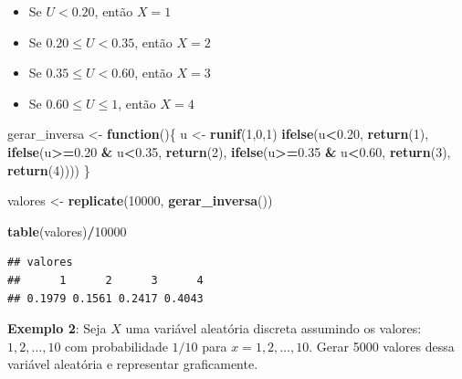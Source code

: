 \documentclass[
]{book}
\newenvironment{Shaded}{\begin{snugshade}}{\end{snugshade}}
\newcommand{\ControlFlowTok}[1]{\textcolor[rgb]{0.13,0.29,0.53}{\textbf{#1}}}
\newcommand{\DecValTok}[1]{\textcolor[rgb]{0.00,0.00,0.81}{#1}}
\newcommand{\FloatTok}[1]{\textcolor[rgb]{0.00,0.00,0.81}{#1}}
\newcommand{\FunctionTok}[1]{\textcolor[rgb]{0.13,0.29,0.53}{\textbf{#1}}}
\newcommand{\NormalTok}[1]{#1}
\newcommand{\OtherTok}[1]{\textcolor[rgb]{0.56,0.35,0.01}{#1}}
\newcommand{\SpecialCharTok}[1]{\textcolor[rgb]{0.81,0.36,0.00}{\textbf{#1}}}
\providecommand{\tightlist}{%
  \setlength{\itemsep}{0pt}\setlength{\parskip}{0pt}}
\begin{document}
\begin{itemize}
\tightlist
\item
  Se \(U <0.20\), então \(X=1\)
\item
  Se \(0.20 \leq U < 0.35\), então \(X=2\)
\item
  Se \(0.35\leq U < 0.60\), então \(X=3\)
\item
  Se \(0.60 \leq U \leq 1\), então \(X=4\)
\end{itemize}

\begin{Shaded}
\begin{Highlighting}[]
\NormalTok{gerar\_inversa }\OtherTok{\textless{}{-}} \ControlFlowTok{function}\NormalTok{()\{}
\NormalTok{  u }\OtherTok{\textless{}{-}} \FunctionTok{runif}\NormalTok{(}\DecValTok{1}\NormalTok{,}\DecValTok{0}\NormalTok{,}\DecValTok{1}\NormalTok{)}
  \FunctionTok{ifelse}\NormalTok{(u}\SpecialCharTok{\textless{}}\FloatTok{0.20}\NormalTok{, }\FunctionTok{return}\NormalTok{(}\DecValTok{1}\NormalTok{), }
         \FunctionTok{ifelse}\NormalTok{(u}\SpecialCharTok{\textgreater{}=}\FloatTok{0.20} \SpecialCharTok{\&}\NormalTok{ u}\SpecialCharTok{\textless{}}\FloatTok{0.35}\NormalTok{, }\FunctionTok{return}\NormalTok{(}\DecValTok{2}\NormalTok{),}
                \FunctionTok{ifelse}\NormalTok{(u}\SpecialCharTok{\textgreater{}=}\FloatTok{0.35} \SpecialCharTok{\&}\NormalTok{ u}\SpecialCharTok{\textless{}}\FloatTok{0.60}\NormalTok{, }\FunctionTok{return}\NormalTok{(}\DecValTok{3}\NormalTok{), }\FunctionTok{return}\NormalTok{(}\DecValTok{4}\NormalTok{))))}
\NormalTok{\}}

\NormalTok{valores }\OtherTok{\textless{}{-}} \FunctionTok{replicate}\NormalTok{(}\DecValTok{10000}\NormalTok{, }\FunctionTok{gerar\_inversa}\NormalTok{())}

\FunctionTok{table}\NormalTok{(valores)}\SpecialCharTok{/}\DecValTok{10000}
\end{Highlighting}
\end{Shaded}

\begin{verbatim}
## valores
##      1      2      3      4 
## 0.1979 0.1561 0.2417 0.4043
\end{verbatim}

\textbf{Exemplo 2}: Seja \(X\) uma variável aleatória discreta assumindo os
valores: \(1,2,\ldots,10\) com probabilidade \(1/10\) para
\(x=1,2,\ldots,10\). Gerar 5000 valores dessa variável aleatória e representar graficamente.
\end{document}
